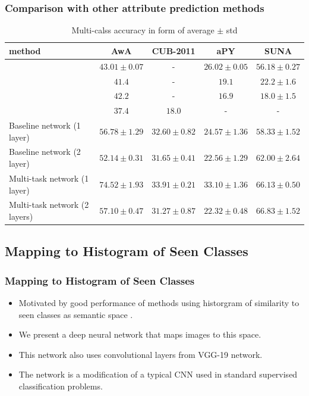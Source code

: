 \documentclass{beamer}
\begin{document}
\begin{frame}\frametitle{Comparison with other attribute prediction methods}
{\scriptsize
\begin{table}
  \caption{Multi-calss accuracy in form of average $\pm$ std}
\begin{tabular}{|l|c|c|c|c|}
\hline
method  & AwA & CUB-2011 & aPY & SUNA \\
\hline \hline
 {\tiny \cite{jayaraman14}}  & $43.01 \pm 0.07$ &        -         & $26.02 \pm 0.05$        & $56.18 \pm 0.27$ \\
\hline
{\tiny \cite{lampert09}} 	&$41.4$ &	-	& 	$19.1$	& $22.2 \pm 1.6$ \\
\hline
{\tiny  \cite{lampert09}} 	&$42.2$ &	-	& 	$16.9$	& $18.0 \pm 1.5$ \\
\hline
{\tiny \cite{akata13}} 	&$37.4$ &	$18.0$& 	-	& - \\
\hline
{\tiny Baseline network (1 layer)}
                      & {${56.78 \pm 1.29}$}  & {${32.60 \pm 0.82}$} & $24.57 \pm 1.36$ & { ${58.33 \pm 1.52}$} \\ \hline
{\tiny Baseline network (2 layer)}
                      & {${52.14 \pm 0.31}$}  & {${31.65 \pm 0.41}$} & {${22.56 \pm 1.29}$} & { ${62.00 \pm 2.64}$} \\ \hline
{\tiny Multi-task network (1 layer)}
                      & {$\mathbf{74.52 \pm 1.93}$}  & {$\mathbf{33.91 \pm 0.21}$} & $\mathbf{33.10 \pm 1.36}$ & { $\mathbf{66.13 \pm 0.50}$} \\ \hline
{\tiny Multi-task network (2 layers)}
                      & {${57.10 \pm 0.47}$}  & {${31.27 \pm 0.87}$} & {${22.32 \pm 0.48}$} & { ${66.83 \pm 1.52}$} \\ \hline
\end{tabular}
\end{table}
}
\end{frame}

\subsection{Mapping to Histogram of Seen Classes}
\label{sec:Mapping to Histogram of Seen Classes}
\begin{frame} \frametitle{Mapping to Histogram of Seen Classes}
  \begin{itemize}
    \item
  Motivated by good performance of methods using historgram of similarity to seen
  classes as semantic space \cite{sse}.
\item
  We present a deep neural network that maps images to this space.
  \item
  This network also uses convolutional layers from VGG-19 network.
  \item
  The network is a modification of a typical CNN used in standard supervised classification problems.
\end{itemize}
\end{frame}
\end{document}
